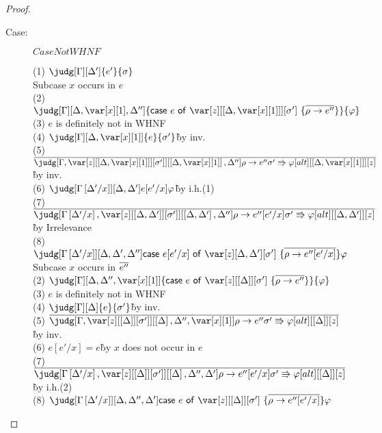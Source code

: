 \begin{proof}
\begin{description}
\item[Case:] $CaseNotWHNF$
\begin{tabbing}
  (1) $\judg[\G][\D']{e'}{\s}$\\
  Subcase $x$ occurs in $e$\\
    (2) $\judg[\G][\D,\xl,\D'']{\ccase{e}{\z[\irr{\D,\xl}][\s']~\{\ov{\rho\to e''}\}}}{\vp}$\\
    (3) $e$ is definitely not in WHNF\\
    (4) $\judg[\G][\D,\xl]{e}{\s'}$\`by inv.\\
    (5) $\ov{\judg[\G,\zr{\irr{\D,\xl}}{\s'}][\irr{\D,\xl},\D'']{\rho\to e''}{\s' \Rrightarrow \vp}[alt][\irr{\D,\xl}][z]}$\`by inv.\\
    (6) $\judg[\subst{\G}{\D'}{x}][\D,\D']{e[e'/x]}{\vp}$\`by i.h.(1)\\
    (7) $\ov{\judg[\subst{\G}{\D'}{x},\zr{\irr{\D,\D'}}{\s'}][\irr{\D,\D'},\D'']{\rho\to e''[e'/x]}{\s' \Rrightarrow \vp}[alt][\irr{\D,\D'}][z]}$ \` by Irrelevance\\
    (8) $\judg[\subst{\G}{\D'}{x}][\D,\D',\D'']{\ccase{e[e'/x]}{\z[\D,\D'][\s']~\{\ov{\rho\to e''[e'/x]}\}}}{\vp}$\\
  Subcase $x$ occurs in $\overline{e''}$\\
    (2) $\judg[\G][\D,\D'',\xl]{\ccase{e}{\z[\irr{\D}][\s']~\{\ov{\rho\to e''}\}}}{\vp}$\\
    (3) $e$ is definitely not in WHNF\\
    (4) $\judg[\G][\D]{e}{\s'}$\`by inv.\\
    (5) $\ov{\judg[\G,\zr{\irr{\D}}{\s'}][\irr{\D},\D'',\xl]{\rho\to e''}{\s' \Rrightarrow \vp}[alt][\irr{\D}][z]}$\`by inv.\\
    (6) $e[e'/x] = e$\` by $x$ does not occur in $e$\\
    (7) $\ov{\judg[\subst{\G}{\D'}{x},\zr{\irr{\D}}{\s'}][\irr{\D},\D'',\D']{\rho\to e''[e'/x]}{\s' \Rrightarrow \vp}[alt][\irr{\D}][z]}$\`by i.h.(2)\\
    (8) $\judg[\subst{\G}{\D'}{x}][\D,\D'',\D']{\ccase{e}{\z[\irr{\D}][\s']~\{\ov{\rho\to e''[e'/x]}\}}}{\vp}$\\
\end{tabbing}


\end{description}
\end{proof}

